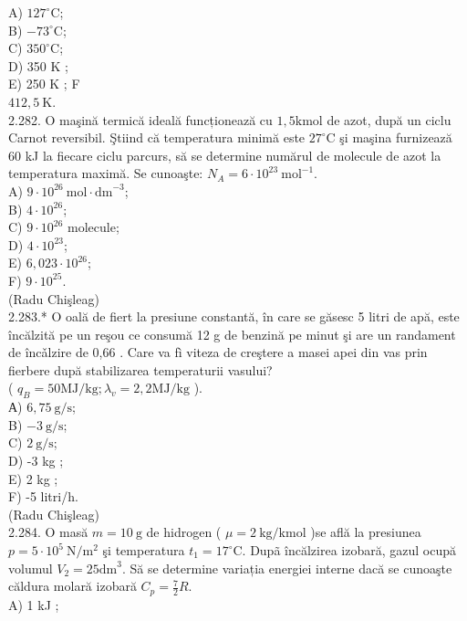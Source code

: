 \documentclass[10pt]{article}
\begin{document}
A) $127^{\circ} \mathrm{C}$;\\
B) $-73^{\circ} \mathrm{C}$;\\
C) $350^{\circ} \mathrm{C}$;\\
D) 350 K ;\\
E) 250 K ; F\\
$412,5 \mathrm{~K}$.\\
2.282. O maşină termică ideală funcționează cu $1,5 \mathrm{kmol}$ de azot, după un ciclu Carnot reversibil. Ştiind că temperatura minimă este $27^{\circ} \mathrm{C}$ şi maşina furnizează 60 kJ la fiecare ciclu parcurs, să se determine numărul de molecule de azot la temperatura maximă. Se cunoaşte: $N_{A}=6 \cdot 10^{23} \mathrm{~mol}^{-1}$.\\
A) $9 \cdot 10^{26} \mathrm{~mol} \cdot \mathrm{dm}^{-3}$;\\
B) $4 \cdot 10^{26}$;\\
C) $9 \cdot 10^{26}$ molecule;\\
D) $4 \cdot 10^{23}$;\\
E) $6,023 \cdot 10^{26}$;\\
F) $9 \cdot 10^{25}$.\\
(Radu Chişleag)\\
2.283.* O oală de fiert la presiune constantă, în care se găsesc 5 litri de apă, este încălzită pe un reşou ce consumă 12 g de benzină pe minut şi are un randament de încǎlzire de 0,66 . Care va fì viteza de creştere a masei apei din vas prin fierbere după stabilizarea temperaturii vasului?\\
( $q_{B}=50 \mathrm{MJ} / \mathrm{kg} ; \lambda_{v}=2,2 \mathrm{MJ} / \mathrm{kg}$ ).\\
А) $6,75 \mathrm{~g} / \mathrm{s}$;\\
B) $-3 \mathrm{~g} / \mathrm{s}$;\\
C) $2 \mathrm{~g} / \mathrm{s}$;\\
D) -3 kg ;\\
E) 2 kg ;\\
F) -5 litri/h.\\
(Radu Chişleag)\\
2.284. O masă $m=10 \mathrm{~g}$ de hidrogen ( $\mu=2 \mathrm{~kg} / \mathrm{kmol}$ )se află la presiunea $p=5 \cdot 10^{5} \mathrm{~N} / \mathrm{m}^{2}$ şi temperatura $t_{1}=17^{\circ} \mathrm{C}$. Dupã încălzirea izobară, gazul ocupă volumul $V_{2}=25 \mathrm{dm}^{3}$. Să se determine variația energiei interne dacă se cunoaşte căldura molară izobară $C_{p}=\frac{7}{2} R$.\\
A) 1 kJ ;\\
\end{document}
